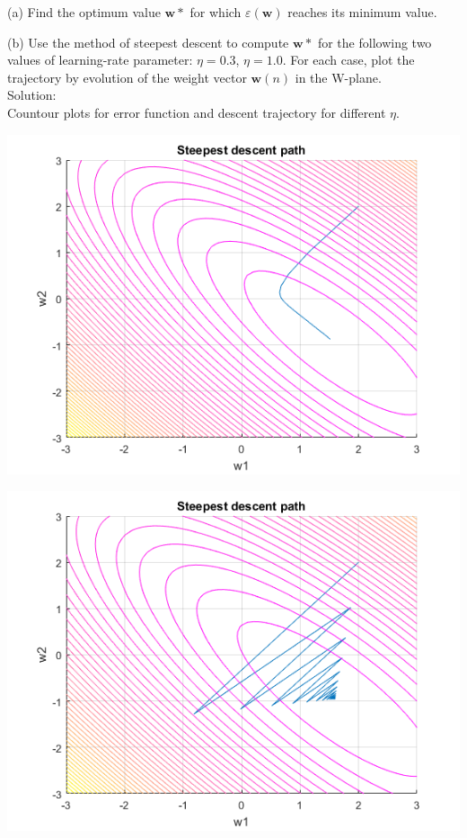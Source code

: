 \documentclass[a4paper, 12pt]{article}
\begin{document}
(a) Find the optimum value $\boldsymbol{w}*$ for which $\varepsilon(\boldsymbol{w})$ reaches its minimum value.

(b) Use the method of steepest descent to compute $\boldsymbol{w}*$ for the following two values of learning-rate parameter: $\eta = 0.3$, $\eta = 1.0$. For each case, plot the trajectory by evolution of the weight vector $\boldsymbol{w}(n)$ in the W-plane.\\

Solution:\\


Countour plots for error function and descent trajectory for different $\eta$.

\includegraphics[scale = 1]{d1.png}

\includegraphics[scale = 1]{d2.png}
\end{document}
